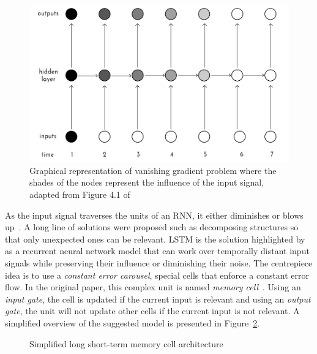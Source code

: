 \begin{figure}[htbp]
    \centering
    \includegraphics[page=1,width=\textwidth]{Figures/outputs_hiddenlayer.pdf}
    \caption{Graphical representation of vanishing gradient problem where the shades of the nodes represent the influence of the input signal, adapted from Figure 4.1 of \textcite{graves_long_2012}}%
    \label{fig:vanishing_gradients}
\end{figure}


As the input signal traverses the units of an RNN, it either diminishes or blows up~\cite{graves_long_2012}.
A long line of solutions were proposed such as decomposing structures so that only unexpected ones can be relevant.
LSTM is the solution highlighted by \textcite{graves_long_2012} as a recurrent neural network model that can work over temporally distant input signals while preserving their influence or diminishing their noise.
The centrepiece idea is to use a \emph{constant error carousel}, special cells that enforce a constant error flow.
In the original paper, this complex unit is named \emph{memory cell}~\cite{hochreiter_long_1997}.
Using an \emph{input gate}, the cell is updated if the current input is relevant and using an \emph{output gate}, the unit will not update other cells if the current input is not relevant.
A simplified overview of the suggested model is presented in Figure~\ref{fig:simple_lstm}.

\begin{figure}[htbp]
    \centering
    \caption{Simplified long short-term memory cell architecture}%
    \label{fig:simple_lstm}
\end{figure}

